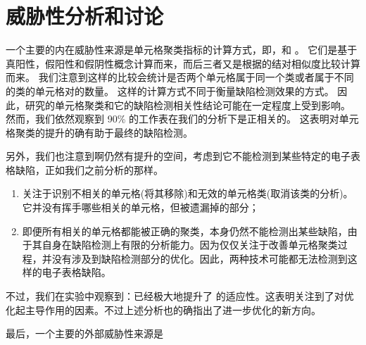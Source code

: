 \section{威胁性分析和讨论}

一个主要的内在威胁性来源是单元格聚类指标的计算方式，即\prc ，\rec 和 \fmc 。
它们是基于真阳性，假阳性和假阴性概念计算而来，而后三者又是根据\cu 的结对相似度比较计算而来。
我们注意到这样的比较会统计是否两个单元格属于同一个类或者属于不同的类的单元格对的数量。
这样的计算方式不同于衡量缺陷检测效果的方式。
因此，研究\wa 的单元格聚类和它的缺陷检测相关性结论可能在一定程度上受到影响。
然而，我们依然观察到 90\% 的工作表在我们的分析下是正相关的。
这表明\wa 对单元格聚类的提升的确有助于最终的缺陷检测。

另外，我们也注意到\wa 啊仍然有提升的空间，考虑到它不能检测到某些特定的电子表格缺陷，正如我们之前分析的那样。
\begin{enumerate}
    \item \wa 关注于识别不相关的单元格(将其移除)和无效的单元格类(取消该类的分析)。它并没有挥手哪些相关的单元格，但被\cu 遗漏掉的部分；
    \item 即便所有相关的单元格都能被正确的聚类，\cu 本身仍然不能检测出某些缺陷，由于其自身在缺陷检测上有限的分析能力。因为\wa 仅仅关注于改善单元格聚类过程，并没有涉及到缺陷检测部分的优化。因此，两种技术可能都无法检测到这样的电子表格缺陷。
\end{enumerate}
不过，我们在实验中观察到：\wa 已经极大地提升了 \cu 的适应性。这表明\wa 关注到了对优化起主导作用的因素。不过上述分析也的确指出了进一步优化的新方向。

最后，一个主要的外部威胁性来源是
